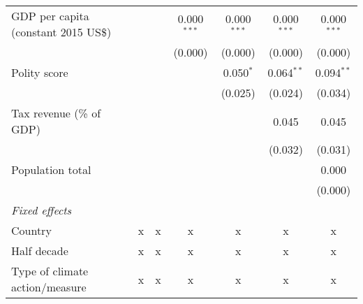 \begin{tabular}{lcccccc}
   GDP per capita (constant 2015 US\$)                                                           &             &               & 0.000$^{***}$  & 0.000$^{***}$  & 0.000$^{***}$  & 0.000$^{***}$\\   
                                                                                                 &             &               & (0.000)        & (0.000)        & (0.000)        & (0.000)\\   
   Polity score                                                                                  &             &               &                & 0.050$^{*}$    & 0.064$^{**}$   & 0.094$^{**}$\\   
                                                                                                 &             &               &                & (0.025)        & (0.024)        & (0.034)\\   
   Tax revenue (\% of GDP)                                                                       &             &               &                &                & 0.045          & 0.045\\   
                                                                                                 &             &               &                &                & (0.032)        & (0.031)\\   
   Population total                                                                              &             &               &                &                &                & 0.000\\   
                                                                                                 &             &               &                &                &                & (0.000)\\   
   \emph{Fixed effects}\\
   Country                                                                                       & x           & x             & x              & x              & x              & x\\  
   Half decade                                                                                   & x           & x             & x              & x              & x              & x\\  
   Type of climate action/measure                                                                & x           & x             & x              & x              & x              & x\\  

\end{tabular}
